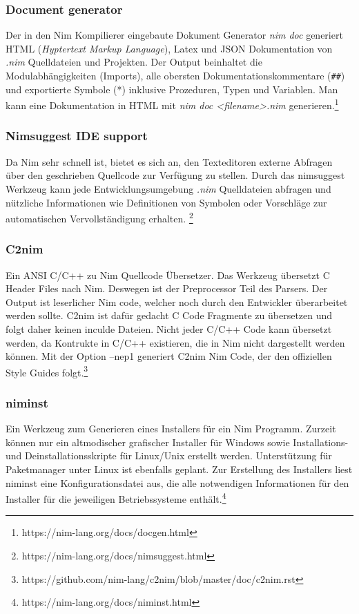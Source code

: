 \documentclass[11pt]{report}
\begin{document}
\subsubsection{Document generator}
Der in den Nim Kompilierer eingebaute Dokument Generator \emph{nim doc} generiert HTML (\emph{Hyptertext Markup Language}), Latex und JSON Dokumentation von \emph{.nim} Quelldateien und Projekten. Der Output beinhaltet die Modulabhängigkeiten (Imports), alle obersten Dokumentationskommentare (\verb|##|) und exportierte Symbole (*) inklusive Prozeduren, Typen und Variablen.
Man kann eine Dokumentation in HTML mit \emph{nim doc <filename>.nim} generieren.\footnote{https://nim-lang.org/docs/docgen.html}

\subsubsection{Nimsuggest IDE support}
Da Nim sehr schnell ist, bietet es sich an, den Texteditoren externe Abfragen über den geschrieben Quellcode zur Verfügung zu stellen.
Durch das nimsuggest Werkzeug kann jede Entwicklungsumgebung \emph{.nim} Quelldateien abfragen und nützliche Informationen wie Definitionen von Symbolen oder Vorschläge zur automatischen Vervollständigung erhalten.
\footnote{https://nim-lang.org/docs/nimsuggest.html}

\subsubsection{C2nim}
Ein ANSI C/C++ zu Nim Quellcode Übersetzer. Das Werkzeug übersetzt C Header Files nach Nim. Deswegen ist der Preprocessor Teil des Parsers. Der Output ist leserlicher Nim code, welcher noch durch den Entwickler überarbeitet werden sollte. C2nim ist dafür gedacht C Code Fragmente zu übersetzen und folgt daher keinen inculde Dateien. Nicht jeder C/C++ Code kann übersetzt werden, da Kontrukte in C/C++ existieren, die in Nim nicht dargestellt werden können. Mit der Option --nep1 generiert C2nim Nim Code, der den offiziellen Style Guides folgt.\footnote{https://github.com/nim-lang/c2nim/blob/master/doc/c2nim.rst}

\subsubsection{niminst}
Ein Werkzeug zum Generieren eines Installers für ein Nim Programm. Zurzeit können nur ein altmodischer grafischer Installer für Windows sowie Installations- und Deinstallationsskripte für Linux/Unix erstellt werden. Unterstützung für Paketmanager unter Linux ist ebenfalls geplant.
Zur Erstellung des Installers liest niminst eine Konfigurationsdatei aus, die alle notwendigen Informationen für den Installer für die jeweiligen Betriebssysteme enthält.\footnote{https://nim-lang.org/docs/niminst.html}
\end{document}
